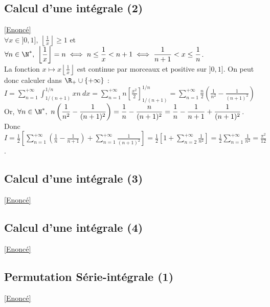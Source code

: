 \documentclass{book}
\begin{document}
	\subsection{Calcul d'une intégrale (2) }\label{sec:calcul-dune-integrale-2-etoile2}
	\textcolor{blue}{\hyperref[calculintégrale2]{[Enoncé]}}\\
	$\forall x\in ]0,1],\ \displaystyle\left\lfloor\frac{1}{x}\right\rfloor\geq 1$ et $\forall n\in \N^*,\ \displaystyle\left\lfloor\frac{1}{x}\right\rfloor=n\iff n\leq \frac{1}{x}<n+1\iff \frac{1}{n+1}<x\leq \frac{1}{n}$.\\
	La fonction $x\mapsto \displaystyle x\left\lfloor\frac{1}{x}\right\rfloor$ est continue par morceaux et positive sur $]0,1]$. On peut donc calculer dans $\R_+\cup\{+\infty\}$ :\\
	$I=\displaystyle\sum\limits_{n=1}^{+\infty}\int_{1/(n+1)}^{1/n}xn\ dx=\sum\limits_{n=1}^{+\infty}n\left[\frac{x^2}{2}\right]_{1/(n+1)}^{1/n}=\sum\limits_{n=1}^{+\infty}\frac{n}{2}\left(\frac{1}{n^2}-\frac{1}{(n+1)^2}\right)$\\
	Or, $\forall n\in \N^*,\ \displaystyle n\left(\frac{1}{n^2}-\frac{1}{(n+1)^2}\right)=\frac{1}{n}-\frac{n}{(n+1)^2}=\frac{1}{n}-\frac{1}{n+1}+\frac{1}{(n+1)^2}$.\\
	Donc $I=\displaystyle\frac{1}{2}\left[\sum\limits_{n=1}^{+\infty}\left(\frac{1}{n}-\frac{1}{n+1}\right)+\sum\limits_{n=1}^{+\infty}\frac{1}{(n+1)^2}\right]=\frac{1}{2}\left[1+\sum\limits_{n=2}^{+\infty}\frac{1}{n^2}\right]=\frac{1}{2}\sum\limits_{n=1}^{+\infty}\frac{1}{n^2}=\frac{\pi^2}{12}$.
	
	\subsection{Calcul d'une intégrale (3)}\label{sec:calcul-dune-integrale-3}
	\textcolor{blue}{\hyperref[calculintégrale3]{[Enoncé]}}\\
	
	\subsection{Calcul d'une intégrale (4)}\label{sec:calcul-dune-integrale-4}
	\textcolor{blue}{\hyperref[calculintégrale4]{[Enoncé]}}\\
	
	\subsection{Permutation Série-intégrale (1)}\label{sec:permutation-serie-integrale-1}
	\textcolor{blue}{\hyperref[Permutation Série-Intégrale 1]{[Enoncé]}}\\
\end{document}
